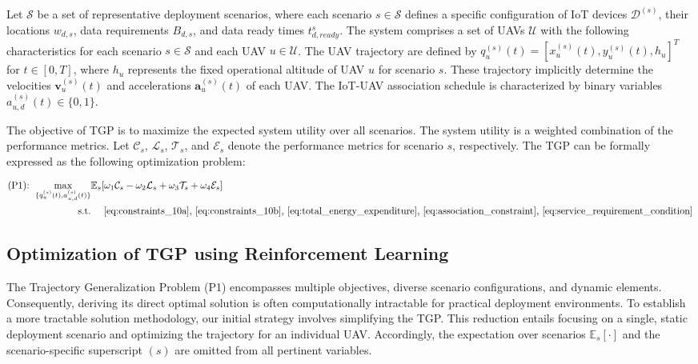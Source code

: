 \documentclass[10pt,conference,letterpaper]{IEEEtran}
\begin{document}
Let $\mathcal{S}$ be a set of representative deployment scenarios, where each scenario $s \in \mathcal{S}$ defines a specific configuration of IoT devices $\mathcal{D}^{(s)}$, their locations $w_{d,s}$, data requirements $B_{d,s}$, and data ready times $t_{d,ready}^{s}$. The system comprises a set of UAVs $\mathcal{U}$ with the following characteristics for each scenario $s\in\mathcal{S}$ and each UAV $u\in\mathcal{U}$. The UAV trajectory are defined by $q_u^{(s)}(t)=[x_u^{(s)}(t),y_u^{(s)}(t),h_u]^{T}$ for $t\in[0,T]$, where $h_u$ represents the fixed operational altitude of UAV $u$ for scenario $s$. These trajectory implicitly determine the velocities $\mathbf{v}_u^{(s)}(t)$ and accelerations $\mathbf{a}_u^{(s)}(t)$ of each UAV. The IoT-UAV association schedule is characterized by binary variables $a_{u,d}^{(s)}(t)\in\{0,1\}$.%



The objective of TGP is to maximize the expected system utility over all scenarios. The system utility is a weighted combination of the performance metrics. Let $\mathcal{C}_{s}$, $\mathcal{L}_{s}$, $\mathcal{T}_{s}$, and $\mathcal{E}_{s}$ denote the performance metrics for scenario $s$, respectively. The TGP can be formally expressed as the following optimization problem:



\begin{equation}
\begin{aligned}
\text{(P1): } \max_{\{q_u^{(s)}(t),a_{u,d}^{(s)}(t)\}} &\mathbb{E}_s[\omega_1 \mathcal{C}_s - \omega_2 \mathcal{L}_s + \omega_3 \mathcal{T}_s + \omega_4 \mathcal{E}_s]\\
\text{s.t.} &\quad \text{~\eqref{eq:constraints_10a},~\eqref{eq:constraints_10b},~\eqref{eq:total_energy_expenditure},~\eqref{eq:association_constraint},~\eqref{eq:service_requirement_condition}}
\end{aligned}
\end{equation}

\subsection{Optimization of TGP using Reinforcement Learning}
\label{subsec:optimization_tgp_rl}

The Trajectory Generalization Problem (P1) encompasses multiple objectives, diverse scenario configurations, and dynamic elements. Consequently, deriving its direct optimal solution is often computationally intractable for practical deployment environments. To establish a more tractable solution methodology, our initial strategy involves simplifying the TGP. This reduction entails focusing on a single, static deployment scenario and optimizing the trajectory for an individual UAV. Accordingly, the expectation over scenarios $\mathbb{E}_s[\cdot]$ and the scenario-specific superscript $(s)$ are omitted from all pertinent variables.
\end{document}

